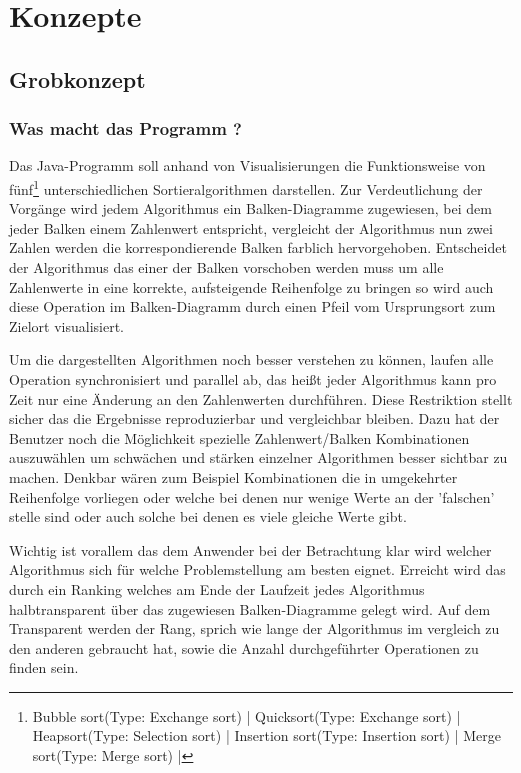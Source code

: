 \chapter{Konzepte}
\label{chap:concepts}
\section{Grobkonzept}
\subsection{Was macht das Programm ?}

Das Java-Programm soll anhand von
Visualisierungen die Funktionsweise von fünf\footnote{
 Bubble sort(Type: Exchange sort) | 
 Quicksort(Type: Exchange sort) | 
 Heapsort(Type: Selection sort) | 
 Insertion sort(Type: Insertion sort) | 
 Merge sort(Type: Merge sort) | 
 } unterschiedlichen Sortieralgorithmen
darstellen. Zur Verdeutlichung der Vorgänge wird jedem Algorithmus ein Balken-Diagramme zugewiesen, bei dem jeder Balken
einem Zahlenwert entspricht, 
vergleicht der Algorithmus nun zwei Zahlen werden die korrespondierende 
Balken farblich hervorgehoben. Entscheidet der Algorithmus das einer der Balken 
vorschoben werden muss um alle Zahlenwerte in eine korrekte, aufsteigende Reihenfolge zu bringen
so wird auch diese Operation im Balken-Diagramm durch einen Pfeil vom Ursprungsort zum 
Zielort visualisiert. \newpage

Um die dargestellten Algorithmen noch besser
verstehen zu können, laufen alle Operation synchronisiert und parallel ab, das heißt
jeder Algorithmus kann pro Zeit nur eine Änderung an den Zahlenwerten durchführen. Diese Restriktion stellt sicher das
die Ergebnisse reproduzierbar und vergleichbar bleiben. 
Dazu hat der Benutzer noch die Möglichkeit spezielle Zahlenwert/Balken Kombinationen 
auszuwählen um schwächen und stärken einzelner Algorithmen besser sichtbar zu machen.
Denkbar wären zum Beispiel Kombinationen die in umgekehrter Reihenfolge vorliegen oder welche bei denen
nur wenige Werte an der 'falschen' stelle sind oder auch solche bei denen es viele gleiche Werte gibt.

Wichtig ist vorallem das dem Anwender bei der Betrachtung klar 
wird welcher Algorithmus sich für welche Problemstellung am besten eignet. 
Erreicht wird das durch ein Ranking welches am Ende der Laufzeit jedes Algorithmus halbtransparent 
über das zugewiesen Balken-Diagramme gelegt wird. Auf dem Transparent werden der Rang, 
sprich wie lange der Algorithmus im vergleich zu den anderen gebraucht hat, 
sowie die Anzahl durchgeführter Operationen zu finden sein.

